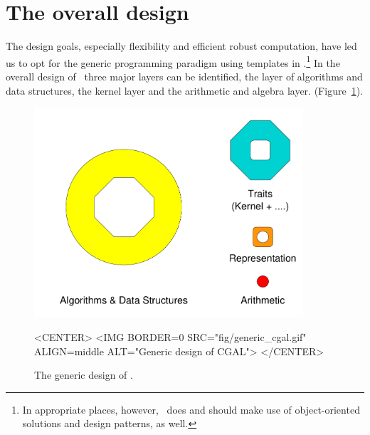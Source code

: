 
\section{The overall design\label{sec:overall_design}}

The design goals, especially flexibility and efficient robust 
computation, have led us to opt for the generic programming paradigm using 
templates in \CC.\footnote{In appropriate places, however, \cgal\ does 
and should make use of object-oriented solutions and design patterns, as well.}
In the overall design of \cgal\ three major layers can be identified, the
layer of algorithms and data structures, the kernel layer and the
arithmetic and algebra layer.
(Figure~\ref{fig:genericCGAL}).

\begin{figure}
\begin{ccTexOnly}
\begin{center}
  \includegraphics[width=10cm]{Developers_manual/fig/generic_cgal}
\end{center}
\end{ccTexOnly}
\caption{The generic design of \cgal.
\label{fig:genericCGAL}}

\begin{ccHtmlOnly}
<CENTER>
<IMG BORDER=0 SRC="fig/generic_cgal.gif" 
  ALIGN=middle ALT="Generic design of CGAL">
</CENTER>
\end{ccHtmlOnly}
\end{figure}

